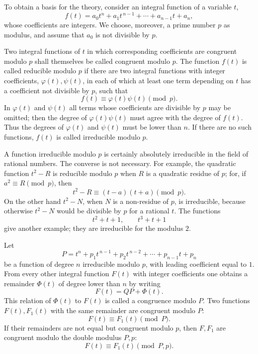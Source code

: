 \documentclass[11pt]{article}
\begin{document}
To obtain a basis for the theory, consider an integral function of a variable $t$,
\begin{equation}
 f(t)=a_0t^n+a_1t^{\,n-1}+\cdots+a_{n-1}t+a_n, \tag{1}
\end{equation}
whose coefficients are integers. We choose, moreover, a prime number $p$ as modulus, and assume that $a_0$ is not divisible by $p$.

Two integral functions of $t$ in which corresponding coefficients are congruent modulo $p$ shall themselves be called congruent modulo $p$. The function $f(t)$ is called reducible modulo $p$ if there are two integral functions with integer coefficients, $\varphi(t),\psi(t)$, in each of which at least one term depending on $t$ has a coefficient not divisible by $p$, such that
\begin{equation}
 f(t)\equiv\varphi(t)\psi(t)\pmod p. \tag{2}
\end{equation}
In $\varphi(t)$ and $\psi(t)$ all terms whose coefficients are divisible by $p$ may be omitted; then the degree of $\varphi(t)\psi(t)$ must agree with the degree of $f(t)$. Thus the degrees of $\varphi(t)$ and $\psi(t)$ must be lower than $n$. If there are no such functions, $f(t)$ is called irreducible modulo $p$.

A function irreducible modulo $p$ is certainly absolutely irreducible in the field of rational numbers. The converse is not necessary. For example, the quadratic function $t^2-R$ is reducible modulo $p$ when $R$ is a quadratic residue of $p$; for, if $a^2\equiv R\pmod p$, then
\[
 t^2-R\equiv(t-a)(t+a)\pmod p.
\]
On the other hand $t^2-N$, when $N$ is a non-residue of $p$, is irreducible, because otherwise $t^2-N$ would be divisible by $p$ for a rational $t$. The functions
\[
 t^2+t+1,\qquad t^3+t+1
\]
give another example; they are irreducible for the modulus $2$.

Let
\begin{equation}
 P=t^n+p_1t^{\,n-1}+p_2t^{\,n-2}+\cdots+p_{n-1}t+p_n \tag{3}
\end{equation}
be a function of degree $n$ irreducible modulo $p$, with leading coefficient equal to $1$. From every other integral function $F(t)$ with integer coefficients one obtains a remainder $\Phi(t)$ of degree lower than $n$ by writing
\begin{equation}
 F(t)=QP+\Phi(t). \tag{4}
\end{equation}
This relation of $\Phi(t)$ to $F(t)$ is called a congruence modulo $P$. Two functions $F(t),F_1(t)$ with the same remainder are congruent modulo $P$:
\[
 F(t)\equiv F_1(t)\pmod P.
\]
If their remainders are not equal but congruent modulo $p$, then $F,F_1$ are congruent modulo the double modulus $P,p$:
\begin{equation}
 F(t)\equiv F_1(t)\pmod {P,p}. \tag{5}
\end{equation}
\end{document}
